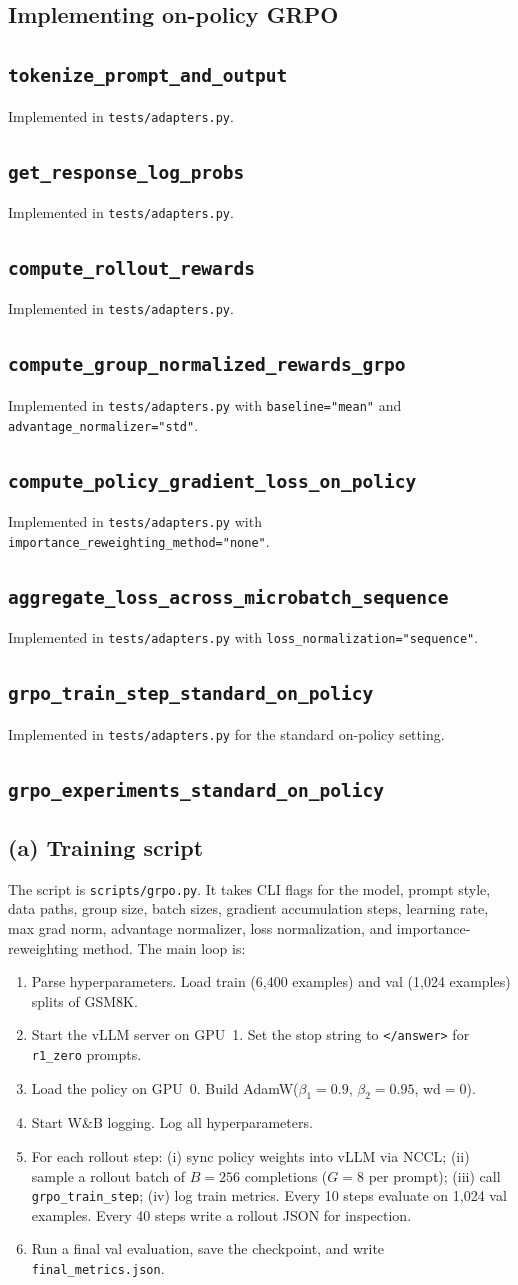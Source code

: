\documentclass[11pt]{article}
\newcommand{\problemid}[1]{\subsection*{\nolinkurl{#1}}}
\begin{document}
\subsection{Implementing on-policy GRPO}

\problemid{tokenize_prompt_and_output}
Implemented in \texttt{tests/adapters.py}.

\problemid{get_response_log_probs}
Implemented in \texttt{tests/adapters.py}.

\problemid{compute_rollout_rewards}
Implemented in \texttt{tests/adapters.py}.

\problemid{compute_group_normalized_rewards_grpo}
Implemented in \texttt{tests/adapters.py} with \texttt{baseline="mean"} and \texttt{advantage\_normalizer="std"}.

\problemid{compute_policy_gradient_loss_on_policy}
Implemented in \texttt{tests/adapters.py} with \texttt{importance\_reweighting\_method="none"}.

\problemid{aggregate_loss_across_microbatch_sequence}
Implemented in \texttt{tests/adapters.py} with \texttt{loss\_normalization="sequence"}.

\problemid{grpo_train_step_standard_on_policy}
Implemented in \texttt{tests/adapters.py} for the standard on-policy setting.

\problemid{grpo_experiments_standard_on_policy}

\subsection*{(a) Training script}

The script is \texttt{scripts/grpo.py}. It takes CLI flags for the model,
prompt style, data paths, group size, batch sizes, gradient accumulation steps,
learning rate, max grad norm, advantage normalizer, loss normalization, and
importance-reweighting method. The main loop is:
\begin{enumerate}
  \item Parse hyperparameters. Load train (6{,}400 examples) and val
    (1{,}024 examples) splits of GSM8K.
  \item Start the vLLM server on GPU~1. Set the stop string to
    \texttt{</answer>} for \texttt{r1\_zero} prompts.
  \item Load the policy on GPU~0. Build AdamW($\beta_1=0.9$, $\beta_2=0.95$, wd$=0$).
  \item Start W\&B logging. Log all hyperparameters.
  \item For each rollout step: (i) sync policy weights into vLLM via NCCL;
    (ii) sample a rollout batch of $B{=}256$ completions ($G{=}8$ per prompt);
    (iii) call \texttt{grpo\_train\_step}; (iv) log train metrics.
    Every 10 steps evaluate on 1{,}024 val examples.
    Every 40 steps write a rollout JSON for inspection.
  \item Run a final val evaluation, save the checkpoint, and write
    \texttt{final\_metrics.json}.
\end{enumerate}
\end{document}
